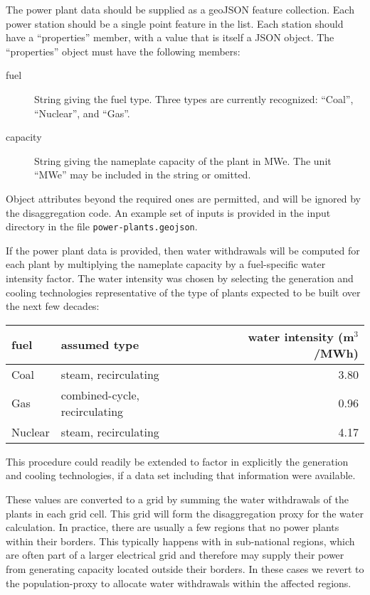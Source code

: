 \documentclass[11pt]{article}
\begin{document}
The power plant data should be supplied as a geoJSON feature
collection.  Each power station should be a single point feature in
the list.  Each station should have a ``properties'' member, with a
value that is itself a JSON object.  The ``properties'' object must
have the following members:
\begin{description}
\item[fuel] String giving the fuel type.  Three types are currently
  recognized:  ``Coal'', ``Nuclear'', and ``Gas''.
\item[capacity] String giving the nameplate capacity of the plant in
  MWe.  The unit ``MWe'' may be included in the string or omitted.
\end{description}
Object attributes beyond the required ones are permitted, and will be
ignored by the disaggregation code.  An example set of inputs is
provided in the input directory in the file
\texttt{power-plants.geojson}.

If the power plant data is provided, then water withdrawals will be
computed for each plant by multiplying the nameplate capacity by a
fuel-specific water intensity factor.  The water intensity was chosen
by selecting the generation and cooling technologies representative of
the type of plants expected to be built over the next few decades:
\begin{center}
\begin{tabular}{|l|l|r|}
  \hline
  fuel & assumed type & water intensity (m$^3$/MWh) \\\hline
  Coal & steam, recirculating &  3.80  \\
  Gas  & combined-cycle, recirculating &  0.96 \\
  Nuclear & steam, recirculating &  4.17 \\\hline
\end{tabular}
\end{center}
This procedure could readily be extended to factor in explicitly the
generation and cooling technologies, if a data set including that
information were available.

These values are converted to a grid by summing the water withdrawals
of the plants in each grid cell.  This grid will form the
disaggregation proxy for the water calculation.  In practice, there
are usually a few regions that no power plants within their borders.
This typically happens with in sub-national regions, which are often
part of a larger electrical grid and therefore may supply their power
from generating capacity located outside their borders.  In these
cases we revert to the population-proxy to allocate water withdrawals
within the affected regions.
\end{document}
